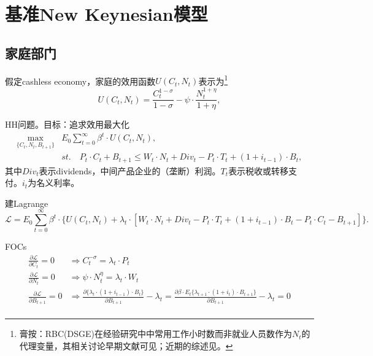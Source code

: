 \chapter{基准New Keynesian模型}
\label{sec:Basic-NK-model}

\section{家庭部门}
\label{sec:Basic-NK-model-HH-sector}


假定cashless economy，家庭的效用函数$U(C_t, N_t)$表示为\footnote{膏按：RBC(DSGE)在经验研究中中常用工作小时数而非就业人员数作为$N_t$的代理变量，其相关讨论早期文献可见\cite{Hansen:1985ku,Rogerson:1988js}；近期的综述见\cite{Rogerson:2009ez}。}
\begin{equation}
  \label{eq:utility-function}
  U(C_t, N_t) = \frac{C_t^{1-\sigma}}{1-\sigma} - \psi \cdot \frac{N_t^{1+\eta}}{1+\eta},
\end{equation}

HH问题。目标：追求效用最大化
\begin{align}
  \label{eq:HH-problem-max}
  \max_{\{C_t, N_t, B_{t+1}\}} & E_0 \sum_{t=0}^{\infty} \beta^t \cdot U(C_t, N_t), \nonumber \\
&st. \quad P_t \cdot C_t + B_{t+1} \le W_t \cdot N_t + Div_t - P_t \cdot T_t + (1+i_{t-1}) \cdot B_t,
\end{align}
其中$Div_t$表示dividends，中间产品企业的（垄断）利润。$T_t$表示税收或转移支付。$i_t$为名义利率。

建Lagrange
\begin{equation}
  \label{eq:HH-problem-lagrange}
  \mathcal{L} = E_0 \sum_{t=0}^{\infty} \beta^t \cdot \{ U(C_t, N_t) + \lambda_t \cdot \left[W_t \cdot N_t + Div_t - P_t \cdot T_t + (1+i_{t-1}) \cdot B_t - P_t \cdot C_t - B_{t+1}\right]\}.
\end{equation}

FOCs
\begin{align*}
  \frac{\partial \mathcal{L}}{\partial C_t}=0 &\Rightarrow C_t^{-\sigma} = \lambda_t \cdot P_t \\
  \frac{\partial \mathcal{L}}{\partial N_t}=0 & \Rightarrow \psi \cdot N_t^{\eta} = \lambda_t \cdot W_t \\
\frac{\partial \mathcal{L}}{\partial B_{t+1}}=0 & \Rightarrow \frac{\partial \{\lambda_t \cdot (1 + i_{t-1}) \cdot B_t\}}{\partial B_{t+1}} - \lambda_t = \frac{\partial \beta \cdot E_t \{ \lambda_{t+1} \cdot (1 + i_{t}) \cdot B_{t+1} \} } {\partial B_{t+1}} - \lambda_t = 0\\
\end{align*}

